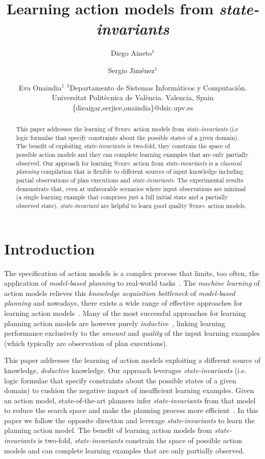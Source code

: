 \documentclass{article}
\title{Learning action models from {\em state-invariants}}
\author{
Diego Aineto$^1$\and
Sergio Jim\'enez$^1$\and
Eva Onaindia$^1$
\affiliations
$^1${\small Departamento de Sistemas Inform\'aticos y Computaci\'on. Universitat Polit\`ecnica de Val\`encia. Valencia, Spain}
\emails
{\scriptsize \{dieaigar,serjice,onaindia\}@dsic.upv.es}}
\newcommand{\strips}{\textsc{Strips}}
\begin{document}
\maketitle


\begin{abstract}
This paper addresses the learning of \strips\ action models from {\em state-invariants} (i.e logic formulae that specify constraints about the possible states of a given domain). The benefit of exploiting {\em state-invariants} is two-fold, they constrain the space of possible action models and they can complete learning examples that are only partially observed. Our approach for learning \strips\ action from {\em state-invariants} is a {\em classical planning} compilation that is flexible to different sources of input knowledge including partial observations of plan executions and {\em state-invariants}. The experimental results demonstrate that, even at unfavorable scenarios where input observations are minimal (a single learning example that comprises just a full initial state and a partially observed state), {\em state-invariant} are helpful to learn good quality \strips\ action models.
\end{abstract}



\section{Introduction}
\label{sec:introduction}
The specification of action models is a complex process that limits, too often, the application of {\em model-based planning} to real-world tasks~\cite{kambhampati:modellite:AAAI2007}. The {\em machine learning} of action models relieves this {\em knowledge acquisition bottleneck} of {\em model-based planning} and nowadays, there exists a wide range of effective approaches for learning action models~\cite{arora:amodels:ker2018}. Many of the most successful approaches for learning planning action models are however purely {\em inductive}~\cite{yang2007learning,pasula2007learning,mourao2010learning,zhuo2013action}, linking learning performance exclusively to the {\em amount} and {\em quality} of the input learning examples (which typically are observation of plan executions). 

This paper addresses the learning of action models exploiting a different source of knowledge, {\em deductive} knowledge. Our approach leverages {\em state-invariants} (i.e. logic formulae that specify constraints about the possible states of a given domain) to cushion the negative impact of insufficient learning examples. Given an action model, state-of-the-art planners infer {\em state-invariants} from that model to reduce the search space and make the planning process more efficient~\cite{helmert2009concise}. In this paper we follow the opposite direction and leverage {\em state-invariants} to learn the planning action model. The benefit of learning action models from {\em state-invariants} is two-fold, {\em state-invariants} constrain the space of possible action models and can complete learning examples that are only partially observed.
\end{document}
